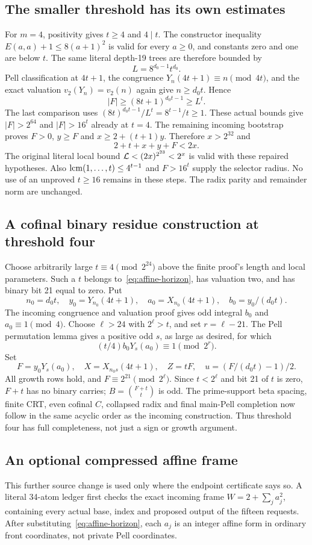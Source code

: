 \subsection{The smaller threshold has its own estimates}
For $m=4$, positivity gives $t\ge4$ and $4\mid t$. The constructor
inequality $E(a,a)+1\le8(a+1)^2$ is valid for every $a\ge0$, and constants
zero and one are below $t$. The same literal depth-19 trees are therefore
bounded by
\[
 L=8^{d_0-1}t^{d_0}.
\]
Pell classification at $4t+1$, the congruence $Y_n(4t+1)\equiv n\pmod{4t}$,
and the exact valuation $v_2(Y_n)=v_2(n)$ again give $n\ge d_0t$. Hence
\[
 |F|\ge(8t+1)^{d_0t-1}\ge L^t.
\]
The last comparison uses $(8t)^{d_0t-1}/L^t=8^{t-1}/t\ge1$.
These actual bounds give $|F|>2^{64}$ and $|F|>16^t$ already at $t=4$.
The remaining incoming bootstrap proves $F>0$, $y\ge F$ and
$x\ge2+(t+1)y$. Therefore $x>2^{32}$ and
\[
 2+t+x+y+F<2x.
\]
The original literal local bound
$\mathcal L<(2x)^{2^{23}}<2^x$ is valid with these repaired hypotheses.
Also $\operatorname{lcm}(1,\ldots,t)\le4^{t-1}$ and $F>16^t$ supply the selector
radius. No use of an unproved $t\ge16$ remains in these steps. The radix
parity and remainder norm are unchanged.

\subsection{A cofinal binary residue construction at threshold four}
Choose arbitrarily large $t\equiv4\pmod{2^{24}}$ above the finite proof's
length and local parameters. Such a $t$ belongs to~\eqref{eq:affine-horizon},
has valuation two, and has binary bit 21 equal to zero. Put
\[
 n_0=d_0t,\quad y_0=Y_{n_0}(4t+1),\quad
 a_0=X_{n_0}(4t+1),\quad b_0=y_0/(d_0t).
\]
The incoming congruence and valuation proof gives odd integral $b_0$ and
$a_0\equiv1\pmod4$. Choose $\ell>24$ with $2^\ell>t$, and set
$r=\ell-21$. The Pell permutation lemma gives a positive odd $s$, as
large as desired, for which
\[
 (t/4)b_0Y_s(a_0)\equiv1\pmod{2^r}.
\]
Set
\[
 F=y_0Y_s(a_0),\quad X=X_{n_0s}(4t+1),\quad Z=tF,
 \quad u=(F/(d_0t)-1)/2.
\]
All growth rows hold, and $F\equiv2^{21}\pmod{2^\ell}$. Since
$t<2^\ell$ and bit 21 of $t$ is zero, $F+t$ has no binary carries;
$B=\binom{F+t}{t}$ is odd. The prime-support beta spacing, finite CRT,
even cofinal $C$, collapsed radix and final main-Pell completion now follow
in the same acyclic order as the incoming construction. Thus threshold four
has full completeness, not just a sign or growth argument.

\subsection{An optional compressed affine frame}
This further source change is used only where the endpoint certificate says
so. A literal 34-atom ledger first checks the exact incoming frame
$W=2+\sum_ja_j^2$, containing every actual base, index and proposed output
of the fifteen requests. After substituting~\eqref{eq:affine-horizon},
each $a_j$ is an integer affine form in ordinary front coordinates, not
private Pell coordinates.

